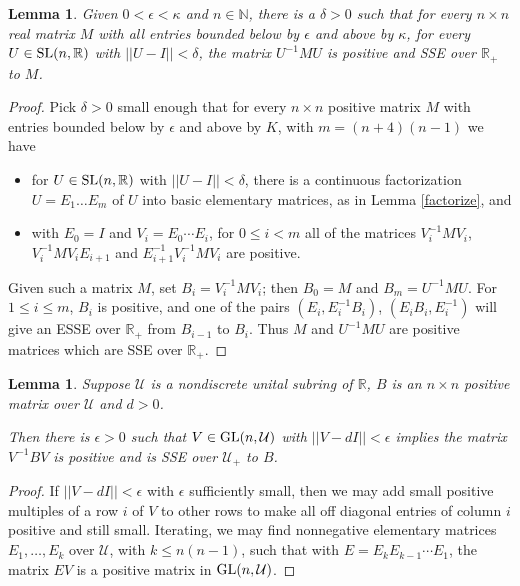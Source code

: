 \documentclass{amsart}
\newtheorem{lemma}[theorem]{Lemma}
\theoremstyle{definition}
\theoremstyle{remark}
\numberwithin{equation}{section}
\begin{document}
{{\begin{lemma} \label{positiveclose}  
Given  $0<\epsilon< \kappa $ and $n\in \mathbb N$, 
there is a $\delta>0$ such that 
for every $n\times n$ real matrix $M$ with all entries 
bounded below by $\epsilon $ and above by $\kappa$, 
for every $U\in \textnormal{SL}(n,\mathbb R)$ with $||U-I||<\delta$, 
the matrix $U^{-1}MU$ is positive and SSE over $\mathbb R_+$ 
to $M$. 
\end{lemma} 
\begin{proof} 
Pick $\delta >0$ 
small enough that for every $n\times n$ 
positive matrix $M$ with entries 
bounded below by $\epsilon $ and above by $K$, 
with $m=(n+4)(n-1)$ we have 
\begin{itemize} 
\item 
for $U\in \textnormal{SL}(n,\mathbb R)$ with $||U-I||< \delta$, there is a 
continuous factorization $U=E_1 \dots E_m$ of $U$ into 
basic elementary matrices, as in Lemma \ref{factorize}, and  
\item 
with $E_0=I$ and $V_i = E_0\cdots E_i$, for $0\leq i <m$ 
all of the matrices $V_i^{-1}MV_{i}$, $V_i^{-1}MV_{i}E_{i+1}$ and 
$E_{i+1}^{-1}V_i^{-1}MV_{i}$ are positive.  
\end{itemize} 
Given such a matrix $M$, 
set $B_i = V_i^{-1}MV_i$; then $B_0 = M$ and $B_m=U^{-1}MU$. 
For $1\leq i \leq m$,  $B_i$ is positive, and 
one 
of the pairs $(E_i, E_i^{-1}B_i)$, $(E_iB_i, E_i^{-1})$ will give an ESSE 
over $\mathbb R_+$ from $B_{i-1}$ to $B_{i}$. Thus $M$ and $U^{-1}MU$ are 
positive matrices which are SSE over $\mathbb R_+$. 
\end{proof} 

\begin{lemma} \label{diagonal} 
Suppose ${\mathcal U}$ is 
a nondiscrete unital subring 
 of $\mathbb R$,
$B$ is an $n\times n$ 
 positive matrix over ${\mathcal U}$ and   $d>0$. 

Then there is $\epsilon > 0$ such that 
 $V\in \textnormal{GL}(n,\mathcal U)$ 
with 
$||V-dI||<\epsilon $ implies the matrix 
$V^{-1}BV$ is  positive and is  SSE over ${\mathcal U}_+$ 
to $B$. 
\end{lemma} 
\begin{proof} 
If $||V-dI||<\epsilon $ 
with $\epsilon $  sufficiently small, then we may add 
small positive multiples of a row $i$ of $V$ to other rows to 
make all off diagonal entries of column $i$ positive and still small. 
Iterating, 
we may find  nonnegative elementary matrices $E_1, \dots , 
E_k$ over ${\mathcal U}$, with $k\leq n(n-1)$, such that 
with $E=E_kE_{k-1}\cdots E_1$, the matrix 
$EV$ is a positive matrix in $\textnormal{GL}(n,{\mathcal U})$. 


\end{proof}}}
\end{document}

